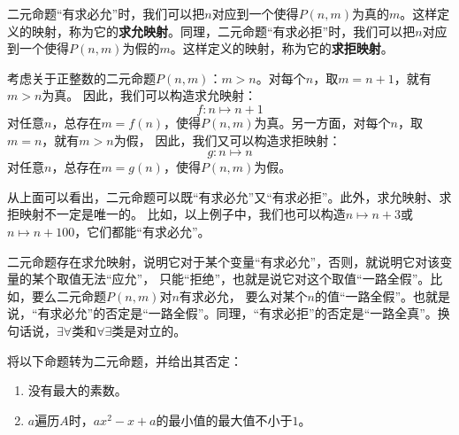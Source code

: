 \documentclass[12pt,UTF8,fontset=none]{ctexbook}
\begin{document}
二元命题“有求必允”时，我们可以把$n$对应到一个使得$P(n,m)$为真的$m$。这样定义的映射，称为它的\textbf{求允映射}。同理，二元命题“有求必拒”时，我们可以把$n$对应到一个使得$P(n,m)$为假的$m$。这样定义的映射，称为它的\textbf{求拒映射}。

\begin{ex*}
    考虑关于正整数的二元命题$P(n,m)$：$m > n$。对每个$n$，取$m = n + 1$，就有$m > n$为真。
    因此，我们可以构造求允映射：
    $$f: n \mapsto n + 1$$
    对任意$n$，总存在$m = f(n)$，使得$P(n,m)$为真。另一方面，对每个$n$，取$m = n$，就有$m > n$为假，
    因此，我们又可以构造求拒映射：
    $$g: n \mapsto n $$
    对任意$n$，总存在$m = g(n)$，使得$P(n,m)$为假。
\end{ex*}

从上面可以看出，二元命题可以既“有求必允”又“有求必拒”。此外，求允映射、求拒映射不一定是唯一的。
比如，以上例子中，我们也可以构造$n \mapsto n + 3$或$n \mapsto n + 100$，它们都能“有求必允”。

二元命题存在求允映射，说明它对于某个变量“有求必允”，否则，就说明它对该变量的某个取值无法“应允”，
只能“拒绝”，也就是说它对这个取值“一路全假”。比如，要么二元命题$P(n,m)$对$n$有求必允，
要么对某个$n$的值“一路全假”。也就是说，“有求必允”的否定是“一路全假”。同理，“有求必拒”的否定是“一路全真”。换句话说，$\exists\forall$类和$\forall\exists$类是对立的。

\begin{et}
    将以下命题转为二元命题，并给出其否定：
    \begin{enumerate}[label=\arabic*.]
        \item 没有最大的素数。
        \item $a$遍历$A$时，$ax^2-x+a$的最小值的最大值不小于$1$。
    \end{enumerate}
\end{et}
\end{document}
